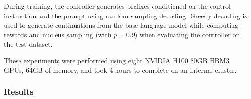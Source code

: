 \documentclass[phd,electronic,oneside,twosidetoc,letterpaper,chaptercenter,parttop,lof]{byumsphd}
\begin{document}
During training, the controller generates prefixes conditioned on the control instruction and the prompt using random sampling decoding. 
Greedy decoding is used to generate continuations from the base language model while computing rewards and nucleus sampling (with \(p=0.9\)) when evaluating the controller on the test dataset. 

These experiments were performed using eight NVIDIA H100 80GB HBM3 GPUs, 64GB of memory, and took 4 hours to complete on an internal cluster.

\subsubsection{Results}

\begin{table}[t]
  \caption{Sentiment control results. The \textit{small}, \textit{medium}, and \textit{large} annotations refer to the size of the controller model which is a version of GPT-2. All of the methods, including baselines, are evaluated using GPT-2 large as the base model to be controlled except for the runs indicating that Llama 3.1 8B is the base model.} \vspace{12pt}
  \label{sentiment-control-table-results}
  \centering
\end{table}
\end{document}
